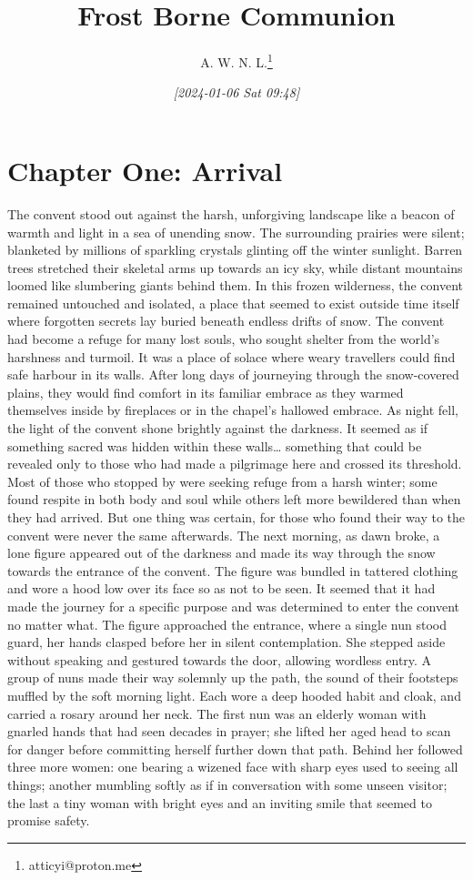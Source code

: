 \documentclass[11pt]{article}
\author{A. W. N. L.\thanks{atticyi@proton.me}}
\date{\textit{[2024-01-06 Sat 09:48]}}
\title{Frost Borne Communion}
\begin{document}
\maketitle
\tableofcontents

\section{Chapter One: Arrival}
\label{sec:org79e68f7}
The convent stood out against the harsh, unforgiving landscape like a beacon of warmth and light in a sea of unending snow. The surrounding prairies were silent; blanketed by millions of sparkling crystals glinting off the winter sunlight. Barren trees stretched their skeletal arms up towards an icy sky, while distant mountains loomed like slumbering giants behind them. In this frozen wilderness, the convent remained untouched and isolated, a place that seemed to exist outside time itself where forgotten secrets lay buried beneath endless drifts of snow.
The convent had become a refuge for many lost souls, who sought shelter from the world's harshness and turmoil. It was a place of solace where weary travellers could find safe harbour in its walls. After long days of journeying through the snow-covered plains, they would find comfort in its familiar embrace as they warmed themselves inside by fireplaces or in the chapel's hallowed embrace.
As night fell, the light of the convent shone brightly against the darkness. It seemed as if something sacred was hidden within these walls\ldots{} something that could be revealed only to those who had made a pilgrimage here and crossed its threshold.
Most of those who stopped by were seeking refuge from a harsh winter; some found respite in both body and soul while others left more bewildered than when they had arrived. But one thing was certain, for those who found their way to the convent were never the same afterwards.
The next morning, as dawn broke, a lone figure appeared out of the darkness and made its way through the snow towards the entrance of the convent. The figure was bundled in tattered clothing and wore a hood low over its face so as not to be seen. It seemed that it had made the journey for a specific purpose and was determined to enter the convent no matter what.
The figure approached the entrance, where a single nun stood guard, her hands clasped before her in silent contemplation. She stepped aside without speaking and gestured towards the door, allowing wordless entry. A group of nuns made their way solemnly up the path, the sound of their footsteps muffled by the soft morning light. Each wore a deep hooded habit and cloak, and carried a rosary around her neck. The first nun was an elderly woman with gnarled hands that had seen decades in prayer; she lifted her aged head to scan for danger before committing herself further down that path. Behind her followed three more women: one bearing a wizened face with sharp eyes used to seeing all things; another mumbling softly as if in conversation with some unseen visitor; the last a tiny woman with bright eyes and an inviting smile that seemed to promise safety.
\end{document}
